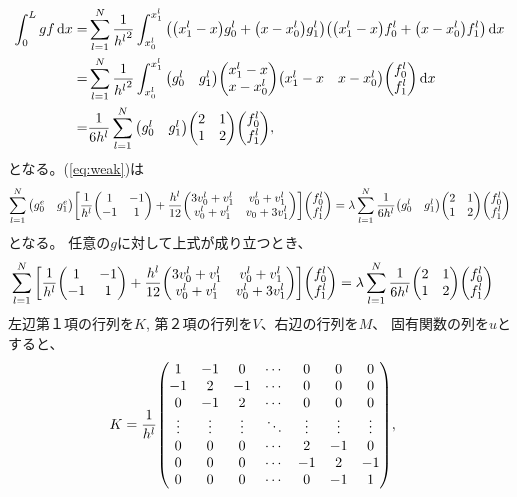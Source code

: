 \documentclass[xelatex,ja=standard]{bxjsarticle}
\begin{document}
\begin{align}
    \int_0^L gf\dd{x}
    =& \sum_{l=1}^N \frac{1}{{h^l}^2}\int_{x^l_0}^{x^l_1}
    \qty(\qty(x^l_1 - x)g^l_0 + \qty(x-x^l_0)g^l_1)\qty(\qty(x^l_1 - x)f^l_0 + \qty(x-x^l_0)f^l_1)
    \dd{x}\notag\\
    =& \sum_{l=1}^N \frac{1}{{h^l}^2}\int_{x^l_0}^{x^l_1}
    \mqty(g^l_0 & g^l_1) \mqty(x^l_1 - x \\ x-x^l_0)\mqty(x^l_1 - x & x-x^l_0)\mqty(f^l_0 \\ f^l_1)
    \dd{x}\notag\\
    =& \frac{1}{6h^l}\sum_{l=1}^N 
    \mqty(g^l_0 & g^l_1) \mqty(2 & 1\\ 1&2)\mqty(f^l_0 \\ f^l_1),
\end{align}
となる。(\ref{eq:weak})は
\begin{align}
    \sum_{l=1}^N \mqty(g^e_0 & g^e_1)\bigg[\frac{1}{h^l}\mqty(1 & -1 \\ -1 & 1)
     + \frac{h^l}{12}\mqty(3v_{0}^l +v_{1}^l & v_{0}^l +v_{1}^l\\ v_{0}^l +v_{1}^l&v_{0} +3v_{1}^l)\bigg]\mqty(f^l_0 \\ f^l_1)=\lambda\sum_{l=1}^N \frac{1}{6h^l} \mqty(g^l_0 & g^l_1)\mqty(2 & 1\\1& 2)\mqty(f^l_0 \\ f^l_1)
\end{align}
となる。 任意の$g$に対して上式が成り立つとき、
\begin{align}
    \sum_{l=1}^N \bigg[\frac{1}{h^l}\mqty(1 & -1 \\ -1 & 1)
     + \frac{h^l}{12}\mqty(3v_{0}^l +v_{1}^l & v_{0}^l +v_{1}^l\\ v_{0}^l +v_{1}^l&v_{0}^l +3v_{1}^l)\bigg]\mqty(f^l_0 \\ f^l_1)&=\lambda\sum_{l=1}^N\frac{1}{6h^l} \mqty(2 & 1\\1& 2)\mqty(f^l_0 \\ f^l_1)
\end{align}     
左辺第１項の行列を$K$, 第２項の行列を$V$、右辺の行列を$M$、 固有関数の列を$u$とすると、
\begin{align}
    K&=
     \frac{1}{h^l}\mqty(
     1 & -1 & 0 & \cdots & 0 & 0 & 0 \\
     -1 & 2 & -1 & \cdots & 0 & 0 & 0 \\
     0 & -1 & 2 & \cdots & 0 & 0 & 0 \\
     \vdots & \vdots & \vdots & \ddots & \vdots  & \vdots& \vdots\\
     0 & 0 & 0 & \cdots & 2 & -1& 0 \\
     0 & 0 & 0 & \cdots & -1 & 2& -1 \\
     0 & 0 & 0 & \cdots & 0 & -1& 1 \\
     ),
\end{align}
\end{document}
